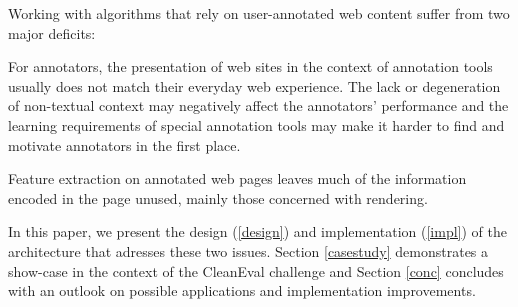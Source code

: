 Working with algorithms that rely on user-annotated web content suffer from two major deficits:


For annotators, the presentation of web sites in the context of annotation tools usually does not match their everyday web experience.
The lack or degeneration of non-textual context may negatively affect the annotators' performance
and the learning requirements of special annotation tools may make it harder to find and motivate annotators in the first place.


Feature extraction on annotated web pages leaves much of the information encoded in the page unused,
mainly those concerned with rendering.


In this paper, we present the design (\ref{design}) and implementation (\ref{impl}) of the {\KrdWrd} architecture that adresses these two issues.
Section \ref{casestudy} demonstrates a show-case in the context of the CleanEval challenge and Section \ref{conc} concludes with an outlook on possible applications and implementation improvements.
